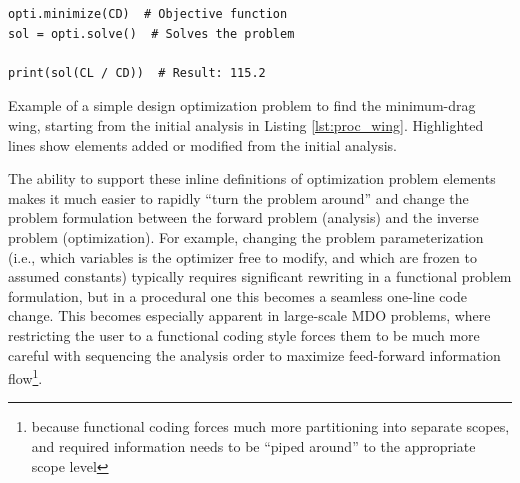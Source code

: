 \begin{enumerate}
\begin{listing}[H]
\begin{verbatim}
opti.minimize(CD)  # Objective function
sol = opti.solve()  # Solves the problem

print(sol(CL / CD))  # Result: 115.2
        \end{verbatim}
        \caption{Example of a simple design optimization problem to find the minimum-drag wing, starting from the initial analysis in Listing \ref{lst:proc_wing}. Highlighted lines show elements added or modified from the initial analysis.}
        \label{lst:proc_wing_opt}
    \end{listing}

    The ability to support these inline definitions of optimization problem elements makes it much easier to rapidly ``turn the problem around'' and change the problem formulation between the forward problem (analysis) and the inverse problem (optimization). For example, changing the problem parameterization (i.e., which variables is the optimizer free to modify, and which are frozen to assumed constants) typically requires significant rewriting in a functional problem formulation, but in a procedural one this becomes a seamless one-line code change. This becomes especially apparent in large-scale MDO problems, where restricting the user to a functional coding style forces them to be much more careful with sequencing the analysis order to maximize feed-forward information flow\footnote{because functional coding forces much more partitioning into separate scopes, and required information needs to be ``piped around'' to the appropriate scope level}.

\end{enumerate}

